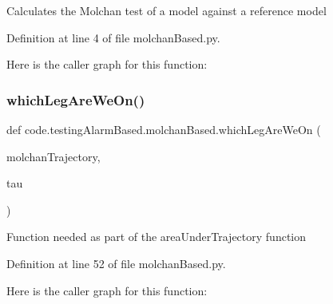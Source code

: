 \begin{DoxyVerb}Calculates the Molchan test of a model against a reference model
\end{DoxyVerb}
 

Definition at line 4 of file molchan\+Based.\+py.

Here is the caller graph for this function\+:
\mbox{\label{namespacecode_1_1testing_alarm_based_1_1molchan_based_acdd42a8c19feb0de5a9f993908a8f2d6}} 
\subsubsection{\texorpdfstring{which\+Leg\+Are\+We\+On()}{whichLegAreWeOn()}}
{\footnotesize\ttfamily def code.\+testing\+Alarm\+Based.\+molchan\+Based.\+which\+Leg\+Are\+We\+On (\begin{DoxyParamCaption}\item[{}]{molchan\+Trajectory,  }\item[{}]{tau }\end{DoxyParamCaption})}

\begin{DoxyVerb}Function needed as part of the areaUnderTrajectory function
\end{DoxyVerb}
 

Definition at line 52 of file molchan\+Based.\+py.

Here is the caller graph for this function\+:
